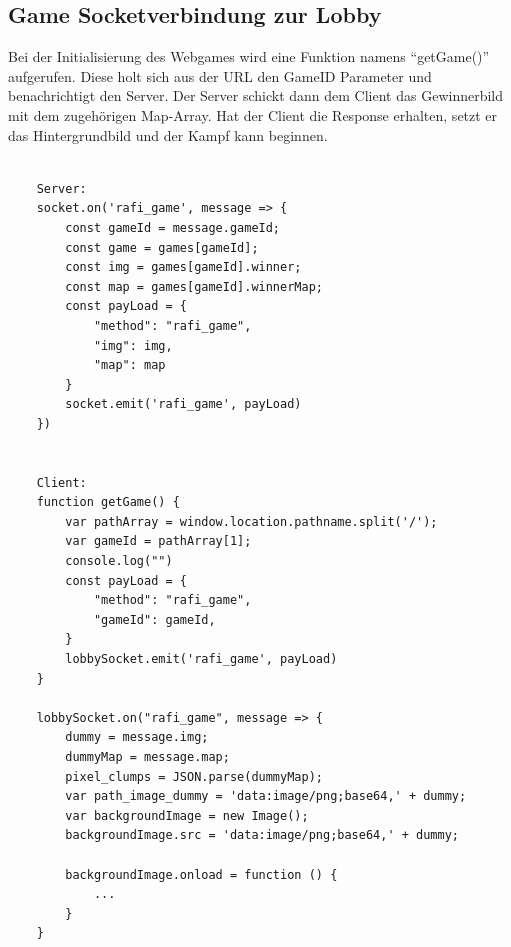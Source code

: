 \subsection{Game Socketverbindung zur Lobby}
Bei der Initialisierung des Webgames wird eine Funktion namens ``getGame()'' aufgerufen. Diese holt sich aus der URL den GameID Parameter und benachrichtigt den Server.
Der Server schickt dann dem Client das Gewinnerbild mit dem zugehörigen Map-Array.
Hat der Client die Response erhalten, setzt er das Hintergrundbild und der Kampf kann beginnen.
\begin{lstlisting}[language=html,caption=Webgame Socket]
    
    Server:
    socket.on('rafi_game', message => {
        const gameId = message.gameId;
        const game = games[gameId];
        const img = games[gameId].winner;
        const map = games[gameId].winnerMap;
        const payLoad = {
            "method": "rafi_game",
            "img": img,
            "map": map
        }
        socket.emit('rafi_game', payLoad)
    })


    Client:
    function getGame() {
        var pathArray = window.location.pathname.split('/');
        var gameId = pathArray[1];
        console.log("")
        const payLoad = {
            "method": "rafi_game",
            "gameId": gameId,
        }
        lobbySocket.emit('rafi_game', payLoad)
    }

    lobbySocket.on("rafi_game", message => {
        dummy = message.img;
        dummyMap = message.map;
        pixel_clumps = JSON.parse(dummyMap);
        var path_image_dummy = 'data:image/png;base64,' + dummy;
        var backgroundImage = new Image();
        backgroundImage.src = 'data:image/png;base64,' + dummy;
    
        backgroundImage.onload = function () {
            ...
        }
    }
\end{lstlisting}

